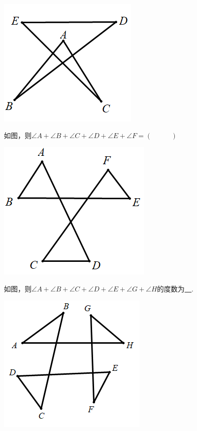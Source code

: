  \includegraphics[scale=0.5]{figure/bazhi04.PNG}
\begin{shaded}
\begin{example}
如图，则$\angle A+\angle B+\angle C+\angle D+\angle E+\angle F=(~\hspace{1cm}~)$\\
\end{example}
\end{shaded}
 \includegraphics[scale=0.5]{figure/bazhi05.PNG}
\begin{shaded}
\begin{example}
如图，则$\angle A+\angle B+\angle C+\angle D+\angle E+\angle G+\angle H$的度数为\underline{~\hspace{1cm}~}.
\end{example}
\end{shaded}
 \includegraphics[scale=0.5]{figure/bazhi06.PNG}

